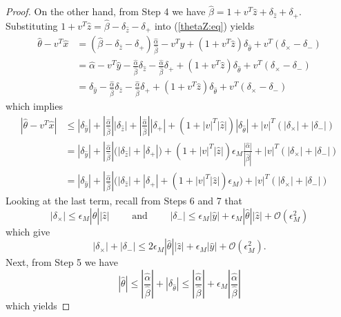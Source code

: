 \documentclass[10pt,a4paper]{amsart}
\newcommand{\eps}{\epsilon}
\newcommand{\eqnref}[1]{(\ref{#1})}
\begin{document}
\begin{proof}
On the other hand, from Step 4 we have $\hat \beta = 1 + v^T \hat z + \delta_{\hat z} + \delta_{+}$. Substituting $1 + v^T \hat z = \hat \beta -  \delta_{\hat z} - \delta_{+}$ into \eqnref{thetaZ:eq} yields
\begin{align}
\hat \theta - v^T \hat x &= (\hat \beta -  \delta_{\hat z} - \delta_{+}) \frac{\hat \alpha}{\hat \beta} - v^T \hat y + (1 + v^T \hat z) \delta_{\hat \theta} + v^T (\delta_{\times} -  \delta_{-}) \nonumber \\
& = \hat \alpha - v^T \hat y - \frac{\hat \alpha}{\hat \beta} \delta_{\hat z}  - \frac{\hat \alpha}{\hat \beta} \delta_{+} + (1 + v^T \hat z) \delta_{\hat \theta} + v^T (\delta_{\times} -  \delta_{-}) \nonumber \\
& = \delta_{\hat y} - \frac{\hat \alpha}{\hat \beta} \delta_{\hat z}  - \frac{\hat \alpha}{\hat \beta} \delta_{+} + (1 + v^T \hat z) \delta_{\hat \theta} + v^T (\delta_{\times} -  \delta_{-}) \label{theta_minus_vx:eq}
\end{align}
which implies
\begin{align}
|\hat \theta - v^T \hat x| & \leq |\delta_{\hat y}| + |\frac{\hat \alpha}{\hat \beta}| |\delta_{\hat z}|  + |\frac{\hat \alpha}{\hat \beta}| |\delta_{+}| + (1 + |v|^T |\hat z|) |\delta_{\hat \theta}| + |v|^T (|\delta_{\times}| + |\delta_{-}|) \nonumber \\
& =  |\delta_{\hat y}| + |\frac{\hat \alpha}{\hat \beta}| \big( |\delta_{\hat z}|  + |\delta_{+}| \big) + (1 + |v|^T |\hat z|) \eps_M \frac{|\hat \alpha|}{|\hat \beta|} + |v|^T (|\delta_{\times}| + |\delta_{-}|) \nonumber\\
& =  |\delta_{\hat y}| + |\frac{\hat \alpha}{\hat \beta}| \Big( |\delta_{\hat z}|  + |\delta_{+}| + (1 + |v|^T |\hat z|) \eps_M \Big) + |v|^T (|\delta_{\times}| + |\delta_{-}|) 
\label{thetaZ2:eq}
\end{align}
Looking at the last term, recall from Steps 6 and 7 that
\[
|\delta_{\times}| \leq \eps_M |\hat \theta| |\hat z| \qquad \mbox{ and } \qquad
|\delta_-| \leq \eps_M |\hat y| + \eps_M |\hat \theta| |\hat z| + \mathcal{O}(\eps_M^2)
\]
which give
\[
|\delta_{\times}| + |\delta_-| \leq 2 \eps_M |\hat \theta| |\hat z|  + \eps_M |\hat y| +  \mathcal{O}(\eps_M^2).
\]
Next, from Step 5 we have
\begin{equation} \label{thetaHatBnd:eq}
|\hat \theta|  \leq  |\frac{\hat \alpha}{\hat \beta}| + |\delta_{\hat \theta}| 
\leq  |\frac{\hat \alpha}{\hat \beta}| + \eps_M  |\frac{\hat \alpha}{\hat \beta}|
\end{equation}
which yields

\end{proof}
\end{document}
